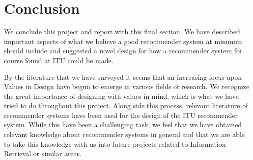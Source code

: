 \section{Conclusion}
We conclude this project and report with this final section. We have described important aspects of what we believe a good recommender system at minimum should include and suggested a novel design for how a recommender system for course found at ITU could be made.\newline

By the literature that we have surveyed it seems that an increasing focus upon Values in Design have begun to emerge in various fields of research. We recognize the great importance of designing with values in mind, which is what we have tried to do throughout this project. Along side this process, relevant literature of recommender systems have been used for the design of the ITU recommender system. While this have been a challenging task, we feel that we have obtained relevant knowledge about recommender systems in general and that we are able to take this knowledge with us into future projects related to Information Retrieval or similar areas.\newline

